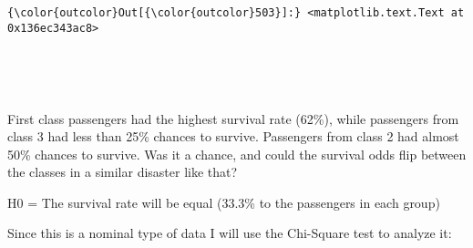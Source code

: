 \documentclass[11pt]{article}
\begin{document}
\begin{Verbatim}[commandchars=\\\{\}]
{\color{outcolor}Out[{\color{outcolor}503}]:} <matplotlib.text.Text at 0x136ec343ac8>
\end{Verbatim}
            
    \begin{center}
    \end{center}
    { \hspace*{\fill} \\}
    
    \begin{center}
    \end{center}
    { \hspace*{\fill} \\}
    
    First class passengers had the highest survival rate (62\%), while
passengers from class 3 had less than 25\% chances to survive.
Passengers from class 2 had almost 50\% chances to survive. Was it a
chance, and could the survival odds flip between the classes in a
similar disaster like that?

H0 = The survival rate will be equal (33.3\% to the passengers in each
group)

Since this is a nominal type of data I will use the Chi-Square test to
analyze it:
\end{document}
